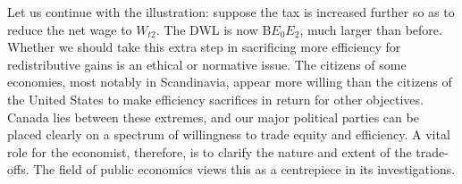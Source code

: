

Let us continue with the illustration: suppose the tax is increased further so as to reduce the net wage to $W_{t2}$. The DWL is now B$E_0E_2$, much larger than before. Whether we should take this extra step in sacrificing more efficiency for redistributive gains is an ethical or normative issue. The citizens of some economies, most notably in Scandinavia, appear more willing than the citizens of the United States to make efficiency sacrifices in return for other objectives. Canada lies between these extremes, and our major political parties can be placed clearly on a spectrum of willingness to trade equity and efficiency. A vital role for the economist, therefore, is to clarify the nature and extent of the trade-offs. The field of public economics views this as a centrepiece in its investigations.
